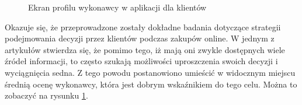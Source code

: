 \begin{figure}[ht]
\begin{subfigure}[t]{0.32\textwidth}
  \end{subfigure}
  \caption[Ekran profilu wykonawcy]{Ekran profilu wykonawcy w aplikacji dla klientów}
  \label{fig:profile}
\end{figure}

Okazuje się, że przeprowadzone zostały dokładne badania dotyczące strategii podejmowania decyzji przez klientów podczas zakupów online. W jednym z artykułów \cite{ratings-presentation} stwierdza się, że pomimo tego, iż mają oni zwykle dostępnych wiele źródeł informacji, to często szukają możliwości uproszczenia swoich decyzji i wyciągnięcia sedna. Z tego powodu postanowiono umieścić w widocznym miejscu średnią ocenę wykonawcy, która jest dobrym wskaźnikiem do tego celu. Można to zobaczyć na rysunku \ref{fig:profile}.

